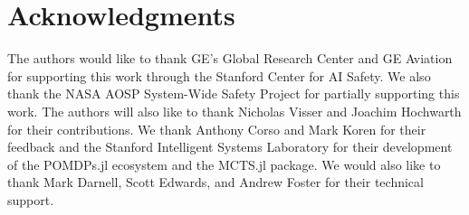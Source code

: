 \section*{Acknowledgments}
The authors would like to thank GE's Global Research Center and GE Aviation for supporting this work through the Stanford Center for AI Safety.
We also thank the NASA AOSP System-Wide Safety Project for partially supporting this work.
The authors will also like to thank Nicholas Visser and Joachim Hochwarth for their contributions.
We thank Anthony Corso and Mark Koren for their feedback and the Stanford Intelligent Systems Laboratory for their development of the POMDPs.jl ecosystem and the MCTS.jl package.
We would also like to thank Mark Darnell, Scott Edwards, and Andrew Foster for their technical support.
